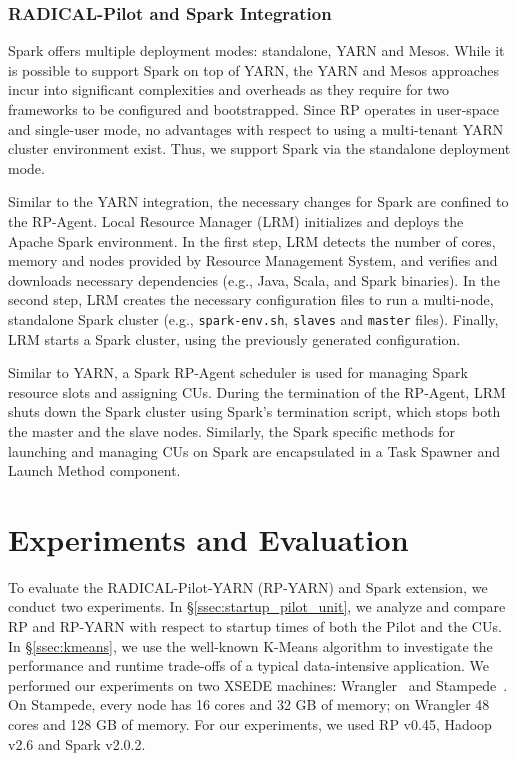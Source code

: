 \subsubsection*{RADICAL-Pilot and Spark Integration}
\label{sssec:rp_spark}

Spark offers multiple deployment modes: standalone, YARN and Mesos. While it is
possible to support Spark on top of YARN, the YARN and Mesos approaches incur
into significant complexities and overheads as they require for two frameworks
to be configured and bootstrapped. Since RP operates in user-space
and single-user mode, no advantages with respect to using a multi-tenant YARN
cluster environment exist. Thus, we support Spark via the standalone deployment
mode.

Similar to the YARN integration, the necessary changes for Spark are confined to
the RP-Agent. Local Resource Manager (LRM) initializes and deploys
the Apache Spark environment. In the first step, LRM detects the number of
cores, memory and nodes provided by Resource Management System, and verifies and
downloads necessary dependencies (e.g., Java, Scala, and Spark binaries). In the
second step, LRM creates the necessary configuration files to run a multi-node,
standalone Spark cluster (e.g., \texttt{spark-env.sh}, \texttt{slaves} and
\texttt{master} files). Finally, LRM starts a Spark cluster, using the
previously generated configuration.

Similar to YARN, a Spark RP-Agent scheduler is used
for managing Spark resource slots and assigning CUs. During the termination of
the RP-Agent, LRM shuts down the Spark cluster using
Spark’s termination script, which stops both the master and the slave nodes.
Similarly, the Spark specific methods for launching and managing CUs
on Spark are encapsulated in a Task Spawner and Launch Method component.

\section{Experiments and Evaluation}
\label{sec:rph-exps}

To evaluate the RADICAL-Pilot-YARN (RP-YARN) and Spark extension, we conduct two
experiments. In \S\ref{ssec:startup_pilot_unit}, we analyze and compare
RP and RP-YARN with respect to startup times of both the
Pilot and the CUs. In \S\ref{ssec:kmeans}, we use the well-known
K-Means algorithm to investigate the performance and runtime trade-offs of a
typical data-intensive application. We performed our experiments on two XSEDE
machines: Wrangler~\cite{wrangler} and Stampede~\cite{stampede}. On Stampede,
every node has 16 cores and 32 GB of memory; on Wrangler 48 cores and 128 GB of
memory. For our experiments, we used RP v0.45, Hadoop v2.6 and Spark
v2.0.2.

